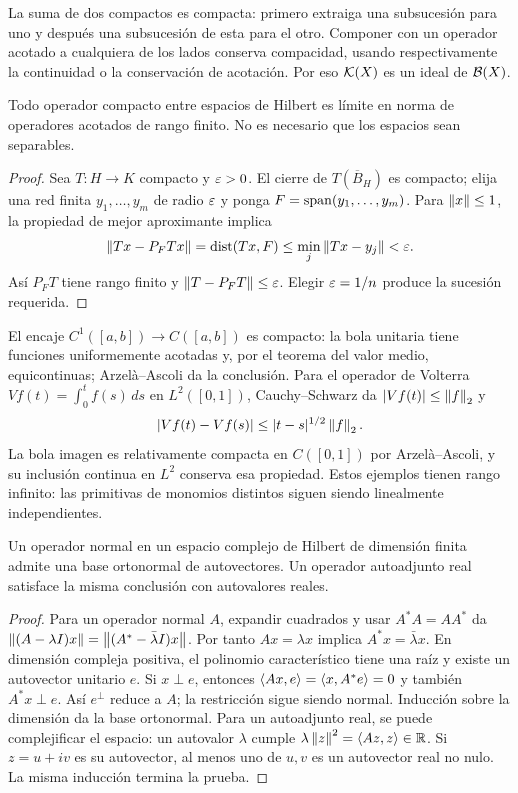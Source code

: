 La suma de dos compactos es compacta: primero extraiga una subsucesión para uno y después una subsucesión de esta para el otro. Componer con un operador acotado a cualquiera de los lados conserva compacidad, usando respectivamente la continuidad o la conservación de acotación. Por eso $\mathcal K(X)$ es un ideal de $\mathcal B(X)$.

\begin{proposicion}\label{v3:aproximacion-compactos}
Todo operador compacto entre espacios de Hilbert es límite en norma de operadores acotados de rango finito. No es necesario que los espacios sean separables.
\end{proposicion}
\begin{proof}
Sea $T:H\to K$ compacto y $\varepsilon>0$. El cierre de $T(\overline B_H)$ es compacto; elija una red finita $y_1,\ldots,y_m$ de radio $\varepsilon$ y ponga $F=\operatorname{span}(y_1,\ldots,y_m)$. Para $\left\lVert x\right\rVert\leq1$, la propiedad de mejor aproximante implica
\[
 \left\lVert Tx-P_FTx\right\rVert=\operatorname{dist}(Tx,F)\leq\min_j\left\lVert Tx-y_j\right\rVert<\varepsilon.
\]
Así $P_FT$ tiene rango finito y $\left\lVert T-P_FT\right\rVert\leq\varepsilon$. Elegir $\varepsilon=1/n$ produce la sucesión requerida.
\end{proof}

El encaje $C^1([a,b])\to C([a,b])$ es compacto: la bola unitaria tiene funciones uniformemente acotadas y, por el teorema del valor medio, equicontinuas; Arzelà--Ascoli da la conclusión. Para el operador de Volterra $Vf(t)=\int_0^tf(s)\,ds$ en $L^2([0,1])$, Cauchy--Schwarz da $|Vf(t)|\leq\left\lVert f\right\rVert_2$ y
\[
 |Vf(t)-Vf(s)|\leq|t-s|^{1/2}\left\lVert f\right\rVert_2.
\]
La bola imagen es relativamente compacta en $C([0,1])$ por Arzelà--Ascoli, y su inclusión continua en $L^2$ conserva esa propiedad. Estos ejemplos tienen rango infinito: las primitivas de monomios distintos siguen siendo linealmente independientes.

\begin{teorema}\label{v3:espectral-finito}
Un operador normal en un espacio complejo de Hilbert de dimensión finita admite una base ortonormal de autovectores. Un operador autoadjunto real satisface la misma conclusión con autovalores reales.
\end{teorema}
\begin{proof}
Para un operador normal $A$, expandir cuadrados y usar $A^*A=AA^*$ da $\left\lVert(A-\lambda I)x\right\rVert=\left\lVert(A^*-\bar\lambda I)x\right\rVert$. Por tanto $Ax=\lambda x$ implica $A^*x=\bar\lambda x$. En dimensión compleja positiva, el polinomio característico tiene una raíz y existe un autovector unitario $e$. Si $x\perp e$, entonces $\left\langle Ax,e\right\rangle=\left\langle x,A^*e\right\rangle=0$ y también $A^*x\perp e$. Así $e^\perp$ reduce a $A$; la restricción sigue siendo normal. Inducción sobre la dimensión da la base ortonormal. Para un autoadjunto real, se puede complejificar el espacio: un autovalor $\lambda$ cumple $\lambda\left\lVert z\right\rVert^2=\left\langle Az,z\right\rangle\in\mathbb R$. Si $z=u+iv$ es su autovector, al menos uno de $u,v$ es un autovector real no nulo. La misma inducción termina la prueba.
\end{proof}

